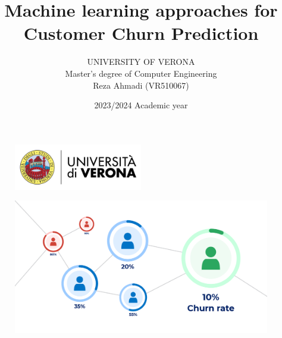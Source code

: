 \documentclass[12pt]{article}
\begin{document}
\setcounter{section}{0}

\title{Machine learning approaches for \\ Customer Churn Prediction}
\author{
  UNIVERSITY OF VERONA\\
  Master's degree of Computer Engineering\\
  Reza Ahmadi (VR510067)
 }
\date{2023/2024 Academic year}
\maketitle
\vspace{1cm}



\begin{figure}[htbp]
  \centering
  \includegraphics[width=0.5\textwidth]{assets/uni_logo.png}
\end{figure}


\begin{figure}[htbp]
  \centering
  \includegraphics[width=\textwidth]{assets/first_page.png}
\end{figure}

\newpage

\tableofcontents

\newpage
\end{document}
